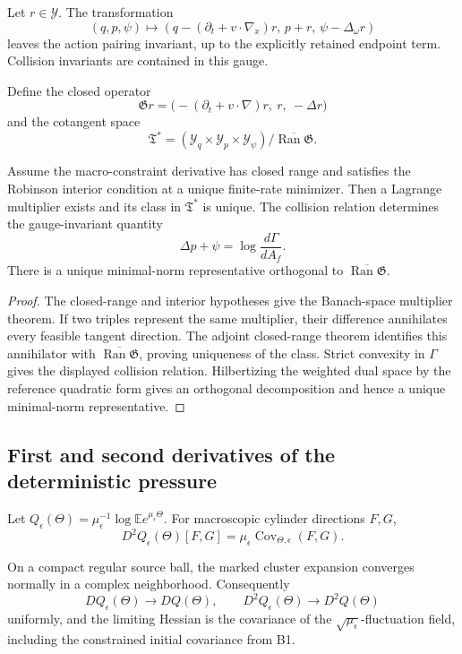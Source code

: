 Let \(r\in\mathcal Y\).  The transformation
\[
 (q,p,\psi)\longmapsto
 \left(
 q-(\partial_t+v\cdot\nabla_x)r,\,
 p+r,\,
 \psi-\Delta_\omega r
 \right)
\]
leaves the action pairing invariant, up to the explicitly retained endpoint
term.  Collision invariants are contained in this gauge.

Define the closed operator
\[
 \mathfrak G r=
 \big(-(\partial_t+v\cdot\nabla)r,\ r,\ -\Delta r\big)
\]
and the cotangent space
\[
 \mathfrak T^*=
 (\mathcal Y_q\times\mathcal Y_p\times\mathcal Y_\psi)/
 \overline{\operatorname{Ran}\mathfrak G}.
\]

\begin{theorem}
\label{thm:rr2-b3-gauge}
Assume the macro-constraint derivative has closed range and satisfies the
Robinson interior condition at a unique finite-rate minimizer.  Then a
Lagrange multiplier exists and its class in \(\mathfrak T^*\) is unique.
The collision relation determines the gauge-invariant quantity
\[
 \Delta p+\psi=\log\frac{d\Gamma}{dA_f}.
\]
There is a unique minimal-norm representative orthogonal to
\(\overline{\operatorname{Ran}\mathfrak G}\).
\end{theorem}

\begin{proof}
The closed-range and interior hypotheses give the Banach-space multiplier
theorem.  If two triples represent the same multiplier, their difference
annihilates every feasible tangent direction.  The adjoint closed-range
theorem identifies this annihilator with
\(\overline{\operatorname{Ran}\mathfrak G}\), proving uniqueness of the
class.  Strict convexity in \(\Gamma\) gives the displayed collision
relation.  Hilbertizing the weighted dual space by the reference quadratic
form gives an orthogonal decomposition and hence a unique minimal-norm
representative.
\end{proof}

\subsection{First and second derivatives of the deterministic pressure}

Let \(Q_\epsilon(\Theta)=\mu_\epsilon^{-1}
\log\mathbb E e^{\mu_\epsilon\Theta}\).  For macroscopic cylinder directions
\(F,G\),
\[
 D^2Q_\epsilon(\Theta)[F,G]
 =
 \mu_\epsilon\operatorname{Cov}_{\Theta,\epsilon}(F,G).
\]

\begin{theorem}
\label{thm:rr2-b3-derivatives}
On a compact regular source ball, the marked cluster expansion converges
normally in a complex neighborhood.  Consequently
\[
 DQ_\epsilon(\Theta)\to DQ(\Theta),\qquad
 D^2Q_\epsilon(\Theta)\to D^2Q(\Theta)
\]
uniformly, and the limiting Hessian is the covariance of the
\(\sqrt{\mu_\epsilon}\)-fluctuation field, including the constrained initial
covariance from B1.
\end{theorem}

